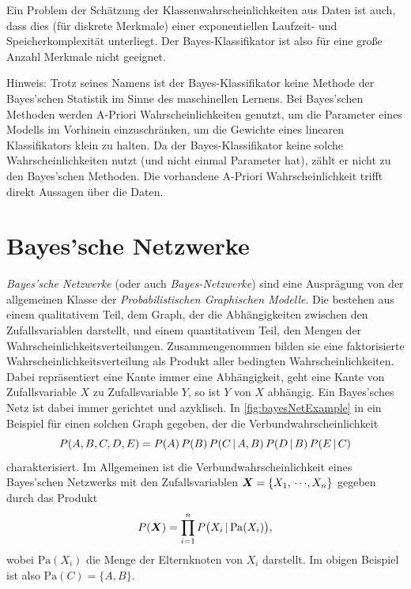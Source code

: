 		Ein Problem der Schätzung der Klassenwahrscheinlichkeiten aus Daten ist auch, dass dies (für diskrete Merkmale) einer exponentiellen Laufzeit- und Speicherkomplexität unterliegt. Der Bayes-Klassifikator ist also für eine große Anzahl Merkmale nicht geeignet.

		Hinweis: Trotz seines Namens ist der Bayes-Klassifikator keine Methode der Bayes'schen Statistik im Sinne des maschinellen Lernens. Bei Bayes'schen Methoden werden A-Priori Wahrscheinlichkeiten genutzt, um die Parameter eines Modells im Vorhinein einzuschränken, \bspw um die Gewichte eines linearen Klassifikators klein zu halten. Da der Bayes-Klassifikator keine solche Wahrscheinlichkeiten nutzt (und nicht einmal Parameter hat), zählt er nicht zu den Bayes'schen Methoden. Die vorhandene A-Priori Wahrscheinlichkeit trifft direkt Aussagen über die Daten.

	\section{Bayes'sche Netzwerke}
		\emph{Bayes'sche Netzwerke} (oder auch \emph{Bayes-Netzwerke}) sind eine Ausprägung von der allgemeinen Klasse der \emph{Probabilistischen Graphischen Modelle}. Die bestehen aus einem qualitativem Teil, dem Graph, der die Abhängigkeiten zwischen den Zufallsvariablen darstellt, und einem quantitativem Teil, den Mengen der Wahrscheinlichkeitsverteilungen. Zusammengenommen bilden sie eine faktorisierte Wahrscheinlichkeitsverteilung als Produkt aller bedingten Wahrscheinlichkeiten. Dabei repräsentiert eine Kante immer eine Abhängigkeit, \dh geht eine Kante von Zufallsvariable \(X\) zu Zufallsvariable \(Y\), so ist \(Y\) von \(X\) abhängig. Ein Bayes'sches Netz ist dabei immer gerichtet und azyklisch. In \autoref{fig:bayesNetExample} in ein Beispiel für einen solchen Graph gegeben, der die Verbundwahrscheinlichkeit
		\begin{equation}
			P(A, B, C, D, E) = P(A) \, P(B) \, P(C \,\vert\, A, B) \, P(D \,\vert\, B) \, P(E \,\vert\, C)
		\end{equation}
		charakterisiert. Im Allgemeinen ist die Verbundwahrscheinlichkeit eines Bayes'schen Netzwerks mit den Zufallsvariablen \( \bm{X} = \{ X_1,\,\cdots\!,X_n \} \) gegeben durch das Produkt
		\begin{equation}
			P(\bm{X}) = \prod_{i = 1}^{n} P\big( X_i \,\vert\, \mathrm{Pa}(X_i) \big),  \label{eq:bayesNetJoint}
		\end{equation}
		wobei \( \mathrm{Pa}(X_i) \) die Menge der Elternknoten von \( X_i \) darstellt. Im obigen Beispiel ist also \( \mathrm{Pa}(C) = \{ A, B \} \).

